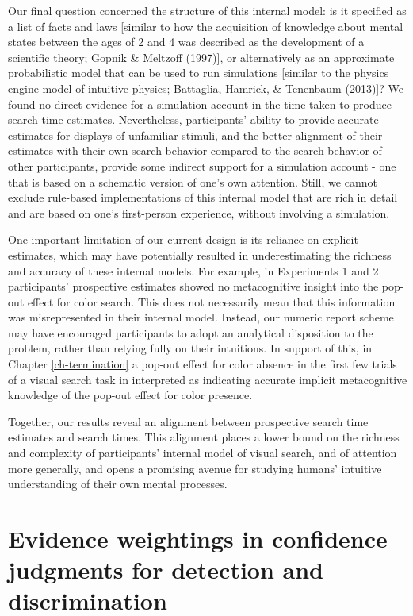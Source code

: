 \documentclass[12pt,twoside]{reedthesis}
\begin{document}
Our final question concerned the structure of this internal model: is it specified as a list of facts and laws {[}similar to how the acquisition of knowledge about mental states between the ages of 2 and 4 was described as the development of a scientific theory; Gopnik \& Meltzoff (1997){]}, or alternatively as an approximate probabilistic model that can be used to run simulations {[}similar to the physics engine model of intuitive physics; Battaglia, Hamrick, \& Tenenbaum (2013){]}? We found no direct evidence for a simulation account in the time taken to produce search time estimates. Nevertheless, participants' ability to provide accurate estimates for displays of unfamiliar stimuli, and the better alignment of their estimates with their own search behavior compared to the search behavior of other participants, provide some indirect support for a simulation account - one that is based on a schematic version of one's own attention. Still, we cannot exclude rule-based implementations of this internal model that are rich in detail and are based on one's first-person experience, without involving a simulation.

One important limitation of our current design is its reliance on explicit estimates, which may have potentially resulted in underestimating the richness and accuracy of these internal models. For example, in Experiments 1 and 2 participants' prospective estimates showed no metacognitive insight into the pop-out effect for color search. This does not necessarily mean that this information was misrepresented in their internal model. Instead, our numeric report scheme may have encouraged participants to adopt an analytical disposition to the problem, rather than relying fully on their intuitions. In support of this, in Chapter \ref{ch-termination} a pop-out effect for color absence in the first few trials of a visual search task in interpreted as indicating accurate implicit metacognitive knowledge of the pop-out effect for color presence.

Together, our results reveal an alignment between prospective search time estimates and search times. This alignment places a lower bound on the richness and complexity of participants' internal model of visual search, and of attention more generally, and opens a promising avenue for studying humans' intuitive understanding of their own mental processes.

\hypertarget{ch-RC}{%
\chapter{Evidence weightings in confidence judgments for detection and discrimination}\label{ch-RC}}
\end{document}
